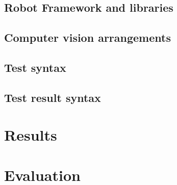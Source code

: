 \subsection{Robot Framework and libraries}
\label{subsection:Robot Framework and libraries}

\subsection{Computer vision arrangements}
\label{subsection:Computer vision arrangements}

\subsection{Test syntax}
\label{subsection:Test syntax}

\subsection{Test result syntax}
\label{subsection:Test result syntax}


\section{Results}
\label{section:Results}

\section{Evaluation}
\label{section:Evaluation}